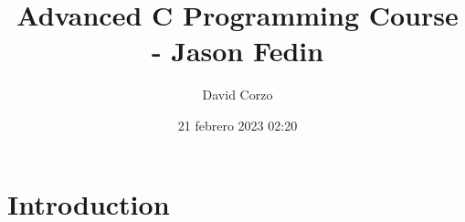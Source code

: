 \documentclass[openany]{book}
\title{Advanced C Programming Course - Jason Fedin}
\date{21 febrero 2023 02:20}
\author{David Corzo}
\begin{document}
\maketitle
\tableofcontents

\chapter{Introduction}


\end{document}
